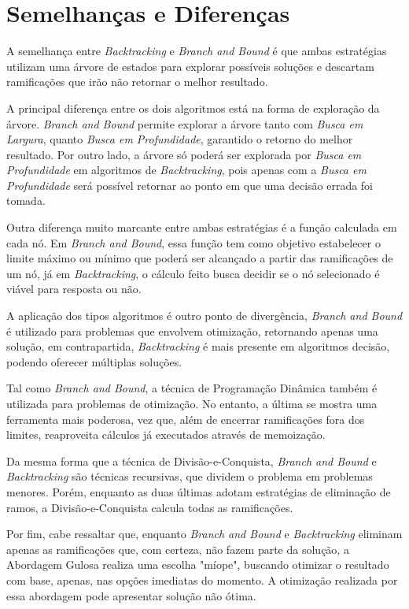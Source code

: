 \documentclass{article}
\begin{document}
\section{Semelhanças e Diferenças}
A semelhança entre \textit{Backtracking} e \textit{Branch and Bound} é que ambas estratégias utilizam uma árvore de estados para explorar possíveis soluções e descartam ramificações que irão não retornar o melhor resultado.
\par
A principal diferença entre os dois algoritmos está na forma de exploração da árvore. \textit{Branch and Bound} permite explorar a árvore tanto com \textit{Busca em Largura}, quanto \textit{Busca em Profundidade}, garantido o retorno do melhor resultado. Por outro lado, a árvore só poderá ser explorada por \textit{Busca em Profundidade} em  algoritmos de \textit{Backtracking}, pois apenas com a \textit{Busca em Profundidade} será possível retornar ao ponto em que uma decisão errada foi tomada.
\par
Outra diferença muito marcante entre ambas estratégias é a função calculada em cada nó. Em \textit{Branch and Bound}, essa função tem como objetivo estabelecer o limite máximo ou mínimo que poderá ser alcançado a partir das ramificações de um nó, já em \textit{Backtracking}, o cálculo feito busca decidir se o nó selecionado é viável para resposta ou não. 
\par
A aplicação dos tipos algoritmos é outro ponto de divergência, \textit{Branch and Bound} é utilizado para problemas que envolvem otimização, retornando apenas uma solução, em contrapartida, \textit{Backtracking} é mais presente em algoritmos decisão, podendo oferecer múltiplas soluções.
\par
Tal como \textit{Branch and Bound}, a técnica de Programação Dinâmica também é utilizada para problemas de otimização. No entanto, a última se mostra uma ferramenta mais poderosa, vez que, além de encerrar ramificações fora dos limites, reaproveita cálculos já executados através de memoização. 
\par
Da mesma forma que a técnica de Divisão-e-Conquista, \textit{Branch and Bound} e \textit{Backtracking} são técnicas recursivas, que dividem o problema em problemas menores. Porém, enquanto as duas últimas adotam estratégias de eliminação de ramos, a Divisão-e-Conquista calcula todas as ramificações. 
\par
Por fim, cabe ressaltar que, enquanto \textit{Branch and Bound} e \textit{Backtracking} eliminam apenas as ramificações que, com certeza, não fazem parte da solução, a Abordagem Gulosa realiza uma escolha "míope", buscando otimizar o resultado com base, apenas, nas opções imediatas do momento. A otimização realizada por essa abordagem pode apresentar solução não ótima.
\end{document}
